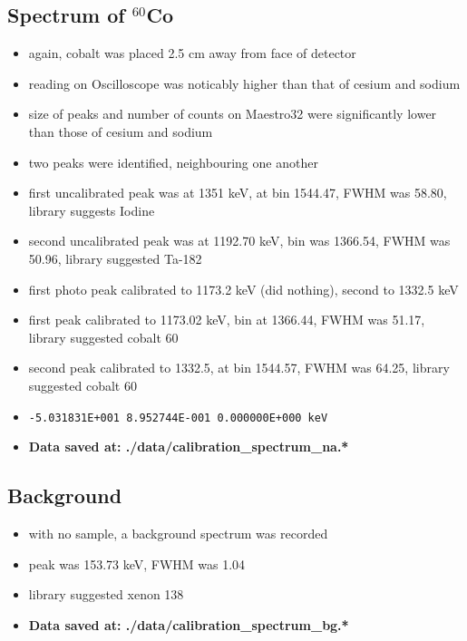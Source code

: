 \documentclass[a4paper]{article}
\begin{document}
\subsection{Spectrum of $^{60}$Co}
\begin{itemize}
    \item again, cobalt was placed 2.5 cm away from face of detector
    \item reading on Oscilloscope was noticably higher than that of cesium and sodium
    \item size of peaks and number of counts on Maestro32 were significantly lower than those of cesium and sodium
    \item two peaks were identified, neighbouring one another
    \item first uncalibrated peak was at 1351 keV, at bin 1544.47, FWHM was 58.80, library suggests Iodine
    \item second uncalibrated peak was at 1192.70 keV, bin was 1366.54, FWHM was 50.96, library suggested Ta-182
    \item first photo peak calibrated to 1173.2 keV (did nothing), second to 1332.5 keV
    \item first peak calibrated to 1173.02 keV, bin at 1366.44, FWHM was 51.17, library suggested cobalt 60
    \item second peak calibrated to 1332.5, at bin 1544.57, FWHM was 64.25, library suggested cobalt 60
    \item \verb|-5.031831E+001 8.952744E-001 0.000000E+000 keV|
    \item \textbf{Data saved at: ./data/calibration\_spectrum\_na.*}
\end{itemize}

\subsection{Background}
\begin{itemize}
    \item with no sample, a background spectrum was recorded
    \item peak was 153.73 keV, FWHM was 1.04
    \item library suggested xenon 138
    \item \textbf{Data saved at: ./data/calibration\_spectrum\_bg.*}
\end{itemize}
\end{document}
